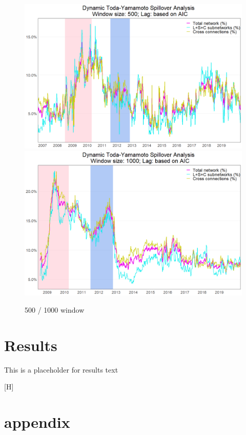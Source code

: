 \documentclass{article}
\begin{document}
\begin{figure}[H]
\caption{500 / 1000 window}
\includegraphics[width=11.5cm]{Time_series_500}
\includegraphics[width=11.5cm]{Time_series_1000}
\centering
\end{figure}



\section{Results}

This is a placeholder for results text



\FloatBarrier

[H]

\section{appendix}
\end{document}

